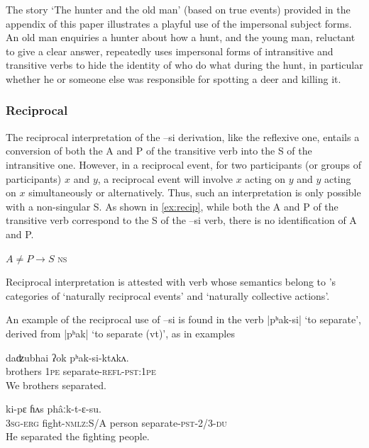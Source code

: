 \documentclass[twoside,a4paper,11pt]{article}
\newcommand{\ipa}[1]{{\phon#1}}
\begin{document}
The story `The hunter and the old man' (based on true events) provided in the appendix of this paper illustrates a playful use of the impersonal subject forms. An old man enquiries a hunter about how a hunt, and the young man, reluctant to give a clear answer, repeatedly uses impersonal forms of intransitive and transitive verbs to hide the identity of who do what during the hunt, in particular whether he or someone else was responsible for spotting a deer and killing it.

\subsubsection{Reciprocal}
The reciprocal  interpretation of the \ipa{--si} derivation, like the reflexive one, entails a conversion of both the A and P of the transitive verb into the S of the intransitive one. However, in a reciprocal event, for two participants (or groups of participants) $x$ and $y$, a reciprocal event will involve $x$ acting on $y$ and $y$  acting on $x$ simultaneously or alternatively.  Thus, such an interpretation is only possible with a non-singular S. As shown in \ref{ex:recip}, while both the A and P of the transitive verb correspond to the S of the  \ipa{--si} verb, there is no identification of A and P.

 \begin{exe}
\ex \label{ex:recip}
\glt $A \neq P  \rightarrow S$ \textsc{ns}

\end{exe}

Reciprocal interpretation is attested with verb whose semantics belong to \citet{kemmer93middle}'s categories of `naturally reciprocal events' and `naturally collective actions'.


An example of the reciprocal use of \ipa{--si} is found in the verb |\ipa{pʰak-si}| `to separate', derived from |\ipa{pʰak}| `to separate (vt)', as in examples 


\begin{exe}
\ex 
\gll 
\ipa{daʣubhai}  	\ipa{ʔok}  	\ipa{pʰak-si-ktʌkʌ.}  \\
brothers \textsc{1pe} separate-\textsc{refl-pst:1pe} \\
\glt We brothers separated.
\end{exe}

\begin{exe}
\ex 
\gll \ipa{ʔʌ̄m-ʔɛ} 	\ipa{ki-pɛ} 	\ipa{ɦʌs} 	\ipa{phâːk-t-ɛ-su.} \\ 
\textsc{3sg-erg} fight-\textsc{nmlz}:S/A person separate-\textsc{pst}-2/3-\textsc{du} \\
\glt He separated the fighting people.
\end{exe}
\end{document}
